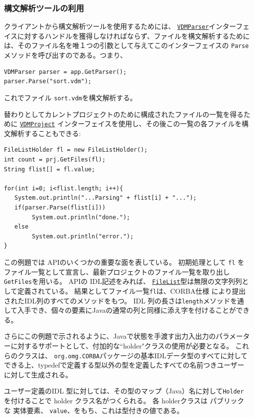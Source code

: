 \documentclass[\pformat,12pt]{jarticle}
\newcommand{\FileList}{\hyperlink{type.FileList}{FileList}}
\newcommand{\VDMParser}{\hyperlink{interface.VDMParser}{VDMParser}}
\newcommand{\VDMProject}{\hyperlink{interface.VDMProject}{VDMProject}}
\begin{document}
\subsubsection{構文解析ツールの利用}

クライアントから構文解析ツールを使用するためには、 {\tt \VDMParser}インターフェイスに対するハンドルを獲得しなければならず、ファイルを構文解析するためには、そのファイル名を唯１つの引数として与えてこのインターフェイスの {\tt Parse} メソッドを呼び出すのである。つまり、

\begin{verbatim}
VDMParser parser = app.GetParser();
parser.Parse("sort.vdm");
\end{verbatim}

これでファイル {\tt sort.vdm}を構文解析する。

替わりとしてカレントプロジェクトのために構成されたファイルの一覧を得るために {\tt \VDMProject} インターフェイスを使用し、その後この一覧の各ファイルを構文解析することもできる:

\begin{verbatim}
FileListHolder fl = new FileListHolder();
int count = prj.GetFiles(fl);
String flist[] = fl.value;
                
for(int i=0; i<flist.length; i++){
   System.out.println("...Parsing" + flist[i] + "...");
   if(parser.Parse(flist[i]))
        System.out.println("done.");
   else
        System.out.println("error.");
}
\end{verbatim}

この例題では APIのいくつかの重要な面を表している。
初期処理として {\tt fl} をファイル一覧として宣言し、最新プロジェクトのファイル一覧を取り出し {\tt GetFiles}を用いる。
APIの IDL記述をみれば、 {\tt \FileList}型は無限の文字列列として定義されている。 
結果としてファイル一覧{\tt fl}は、CORBA仕様 \cite{OMG&96} により提出されたIDL列のすべてのメソッドをもつ。
 IDL 列の長さは{\tt length}メソッドを通して入手でき、個々の要素にJavaの通常の列と同様に添え字を付けることができる。

さらにこの例題で示されるように、Javaで状態を手渡す出力入出力のパラメーターに対するサポートとして、付加的な``holder"クラスの使用が必要となる。
これらのクラスは、 {\tt org.omg.CORBA}パッケージの基本IDLデータ型のすべてに対してできる上、typedefで定義する型以外の型を定義したすべての名前つきユーザーに対して生成される。

ユーザー定義のIDL 型に対しては、その型のマップ（Java）名に対して{\tt Holder}を付けることで  holder クラス名がつくられる。
各 holderクラスは パブリックな 実体要素、 {\tt value}、をもち、これは型付きの値である。
\end{document}
